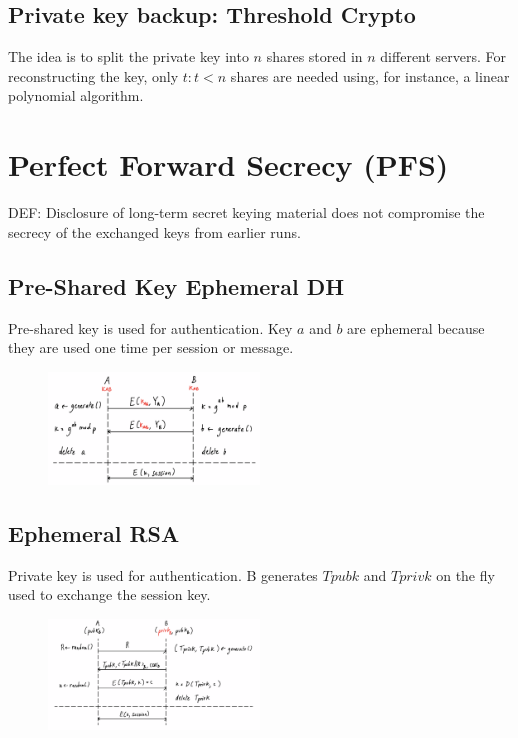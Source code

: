 \documentclass[a4paper,12pt]{article}
\begin{document}
\subsection{Private key backup: Threshold Crypto}
The idea is to split the private key into $n$ shares stored in $n$ different servers.
For reconstructing the key, only $t : t < n$ shares are needed using, for instance, a linear polynomial algorithm.

\section{Perfect Forward Secrecy (PFS)}
DEF: Disclosure of long-term secret keying material does not compromise the secrecy of the exchanged keys from earlier runs.

\subsection{Pre-Shared Key Ephemeral DH}
Pre-shared key is used for authentication.
Key $a$ and $b$ are ephemeral because they are used one time per session or message.

\begin{figure}[H]
  \centering
  \includegraphics[width=0.5\textwidth]{img/psk-dhe}
\end{figure}

\subsection{Ephemeral RSA}
Private key is used for authentication.
B generates $Tpubk$ and $Tprivk$ on the fly used to exchange the session key.

\begin{figure}[H]
  \centering
  \includegraphics[width=0.5\textwidth]{img/rsae}
\end{figure}
\end{document}
